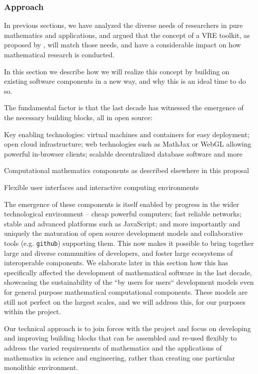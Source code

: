 \subsubsection{Approach}

In previous sections, we have analyzed the diverse needs of
researchers in pure mathematics and applications, and argued that the
concept of a VRE toolkit, as proposed by \TheProject, will match those
needs, and have a considerable impact on how mathematical research is
conducted.

In this section we describe how we will realize this concept by
building on existing software components in a new way, and why
this is an ideal time to do so.
\begin{framed}
  The fundamental factor is that the last decade has witnessed the
  emergence of the necessary building blocks, all in open source:
  \begin{compactitem}
  \item Key enabling technologies: virtual machines and containers for easy
    deployment; open cloud infrastructure; web technologies
    such as MathJax or WebGL allowing powerful in-browser clients; scalable
    decentralized database software and more
  \item Computational mathematics components as described elsewhere in
    this proposal
  \item Flexible user interfaces and interactive computing environments
  \end{compactitem}
\end{framed}

The emergence of these components is itself enabled by progress in the
wider technological environment -- cheap powerful computers; fast
reliable networks; stable and advanced platforms such as JavaScript;
and more importantly and uniquely the maturation of open source
development models and collaborative tools (e.g. \texttt{github})
supporting them. This now
makes it possible to  bring together large and diverse communities of
developers, and foster large ecosystems of interoperable
components. We elaborate later in this section how this has
specifically affected the development of mathematical software in the
last decade, showcasing the sustainability of the ``by users for
users`` development models even for general purpose mathematical
computational components. These models are still not perfect on the
largest scales, and we will address this, for our purposes within the project.

\begin{framed}
  Our technical approach is to join forces with the \Jupyter project and focus on developing
  and improving building blocks that can be
  assembled and re-used flexibly to address the varied
  requirements of mathematics and the applications of mathematics in
  science and engineering, rather than creating one particular
  monolithic environment.
\end{framed}
